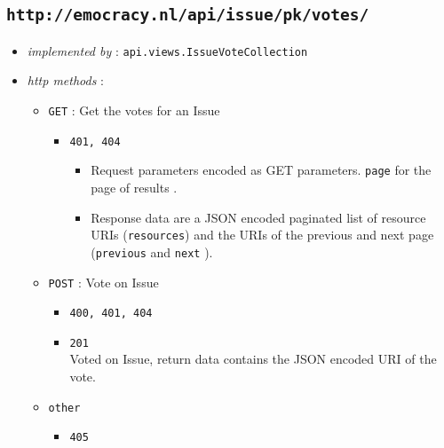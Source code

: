 \documentclass[a4paper]{report}
\begin{document}
\subsection{\texttt{http://emocracy.nl/api/issue/\textsf{pk}/votes/}}
\begin{itemize}
    \item{\textsl{implemented by} : \texttt{api.views.IssueVoteCollection}}
    \item{\textsl{http methods} :
        \begin{itemize}
            \item{\texttt{GET} : Get the votes for an Issue
                \begin{itemize}
                    \item{\texttt{401, 404}}
                    \begin{itemize}
                        \item{Request parameters encoded as GET parameters. 
                        \texttt{page} for the page of results .}
                        \item{Response data are a JSON encoded paginated list of 
                        resource URIs (\texttt{resources}) and the URIs of the 
                        previous and next page (\texttt{previous} and \texttt{next}
                        ).}
                    \end{itemize}
                \end{itemize}
            }
            \item{\texttt{POST} : Vote on Issue
                \begin{itemize}
                    \item{\texttt{400, 401, 404}}
                    \item{\texttt{201}\\
                    Voted on Issue, return data contains the JSON encoded
                    URI of the vote.}
                \end{itemize}
            }
            \item{\texttt{other}
                \begin{itemize}
                    \item{\texttt{405}}
                \end{itemize}
            }
        \end{itemize}
    }
\end{itemize}
\end{document}
